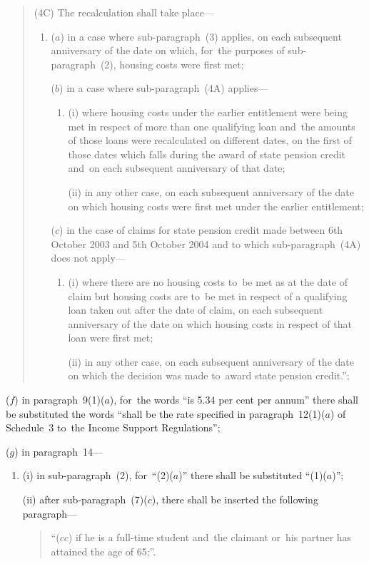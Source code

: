 \documentclass[12pt,a4paper]{article}
\begin{document}
\begin{enumerate}
\begin{enumerate}
\begin{quotation}
(4C) The recalculation shall take place—
\begin{enumerate}\item[]
($a$) in a case where sub-paragraph~(3) applies, on each subsequent anniversary of the date on which, for~the purposes of sub-paragraph~(2), housing costs were first met;

($b$) in a case where sub-paragraph~(4A) applies—
\begin{enumerate}\item[]
(i) where housing costs under the earlier entitlement were being met in respect of more than one qualifying loan and~the amounts of those loans were recalculated on different dates, on the first of those dates which falls during the award of state pension credit and~on each subsequent anniversary of that date;

(ii) in any other case, on each subsequent anniversary of the date on which housing costs were first met under the earlier entitlement;
\end{enumerate}

($c$) in the case of claims for state pension credit made between 6th October 2003 and 5th October 2004 and to which sub-paragraph~(4A) does not apply—
\begin{enumerate}\item[]
(i) where there are no housing costs to~be met as at the date of claim but housing costs are to~be met in respect of a qualifying loan taken out after the date of claim, on each subsequent anniversary of the date on which housing costs in respect of that loan were first met;

(ii) in any other case, on each subsequent anniversary of the date on which the decision was made to~award state pension credit.”;
\end{enumerate}
\end{enumerate}
\end{quotation}
\end{enumerate}

($f$) in paragraph~9(1)($a$), for~the words “is 5$.$34 per cent per annum” there shall be substituted the words “shall be the rate specified in paragraph~12(1)($a$)  of Schedule~3 to~the Income Support Regulations”;

($g$) in paragraph~14—
\begin{enumerate}\item[]
(i) in sub-paragraph~(2), for~“(2)($a$)” there shall be substituted “(1)($a$)”;

(ii) after sub-paragraph~(7)($c$), there shall be inserted the following paragraph—
\begin{quotation}
“($cc$) if he is a full-time student and~the claimant or~his partner has attained the age of 65;”.
\end{quotation}
\end{enumerate}
\end{enumerate}
\end{document}
